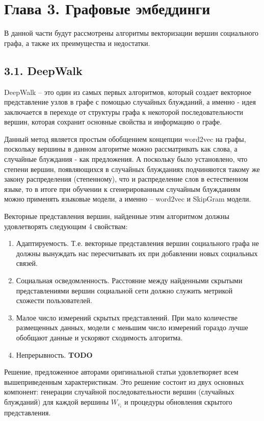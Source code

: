 \section{Глава 3. Графовые эмбеддинги}
В данной части будут рассмотрены алгоритмы векторизации вершин социального графа, а также их преимущества и недостатки.

\subsection{3.1. DeepWalk}

DeepWalk \cite{DeepWalk} -- это один из самых первых алгоритмов, который создает векторное представление узлов в графе с помощью случайных блужданий, а именно - идея заключается в переходе от структуры графа к некоторой последовательности вершин, которая сохранит основные свойства и информацию о графе. 

Данный метод является простым обобщением концепции word2vec \cite{word2vec} на графы, поскольку вершины в данном алгоритме можно рассматривать как слова, а случайные блуждания - как предложения. А поскольку было установлено, что степени вершин, появляющихся в случайных блужданиях подчиняются такому же закону распределения (степенному), что и распределение слов в естественном языке, то в итоге при обучении к сгенерированным случайным блужданиям можно применять языковые модели, а именно -- word2vec и SkipGram модели.  

Векторные представления вершин, найденные этим алгоритмом должны удовлетворять следующим 4 свойствам:

\begin{enumerate}
\item Адаптируемость. Т.е. векторные представления вершин социального графа не должны вынуждать нас пересчитывать их при добавлении новых социальных связей.
\item Социальная осведомленность. Расстояние между найденными скрытыми представлениями вершин социальной сети должно служить метрикой схожести пользователей.
\item Малое число измерений скрытых представлений. При мало количестве размещенных данных, модели с меньшим число измерений гораздо лучше обобщают данные и ускоряют сходимость алгоритма.
\item Непрерывность. \textbf{TODO}
\end{enumerate}

Решение, предложенное авторами оригинальной статьи удовлетворяет всем вышеприведенным характеристикам. Это решение состоит
из двух основных компонент: генерации случайной последовательности вершин (случайных блужданий) для каждой вершины $W_{v_i}$ и процедуры обновления скрытого представления.

